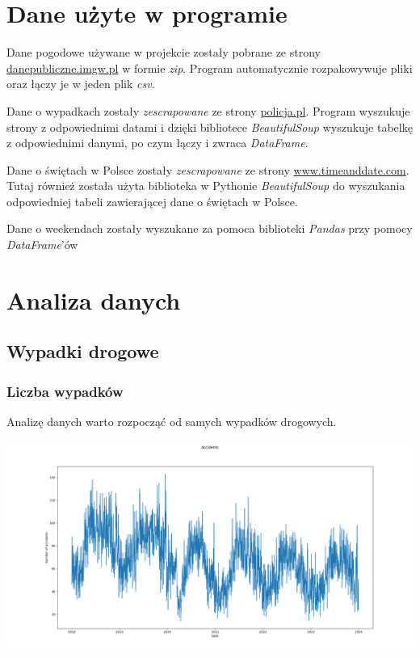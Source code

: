 \documentclass{article}
\begin{document}
\section{Dane użyte w programie}

Dane pogodowe używane w projekcie zostały pobrane ze strony
\href{https://danepubliczne.imgw.pl/}{danepubliczne.imgw.pl} w formie \textit{zip}. Program automatycznie rozpakowywuje pliki oraz łączy je w jeden plik \textit{csv}.

Dane o wypadkach zostały \textit{zescrapowane} ze strony \href{https://policja.pl/pol/statystyka}{policja.pl}. Program wyszukuje strony z odpowiednimi datami i dzięki bibliotece \textit{BeautifulSoup} wyszukuje tabelkę z odpowiednimi danymi, po czym łączy i zwraca \textit{DataFrame}. 

Dane o świętach w Polsce zostały \textit{zescrapowane} ze strony \href{https://www.timeanddate.com/holidays/poland/}{www.timeanddate.com}.
Tutaj również została użyta biblioteka w Pythonie \textit{BeautifulSoup} do wyszukania odpowiedniej tabeli zawierającej dane o świętach w Polsce.

Dane o weekendach zostały wyszukane za pomoca biblioteki \textit{Pandas} przy pomocy \textit{DataFrame}'ów

\section{Analiza danych}
\subsection{Wypadki drogowe}
\subsubsection{Liczba wypadków}
Analizę danych warto rozpocząć od samych wypadków drogowych.

\begin{center}
    \includegraphics[width=\textwidth]{visualization/accidents.png}
    \captionsetup{hypcap=false}
    \label{fig:accidents}
\end{center}
\end{document}
